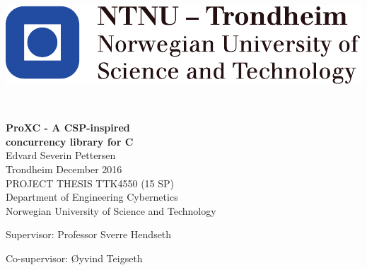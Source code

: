 
\thispagestyle{empty}

\begin{center}
\includegraphics{fig/NTNU}
\end{center}

\mbox{}\\[6pc]
\begin{center}
\Huge\textbf{ProXC - A CSP-inspired\\ concurrency library for C}\\[2pc]

\Large{Edvard Severin Pettersen}\\[1pc]
\large{Trondheim December 2016}\\[2pc]

PROJECT THESIS TTK4550 (15 SP)\\
Department of Engineering Cybernetics\\
Norwegian University of Science and Technology
\end{center}
\vfill

\noindent Supervisor: Professor Sverre Hendseth

\noindent Co-supervisor: Øyvind Teigseth

\afterpage{\blankpage}

